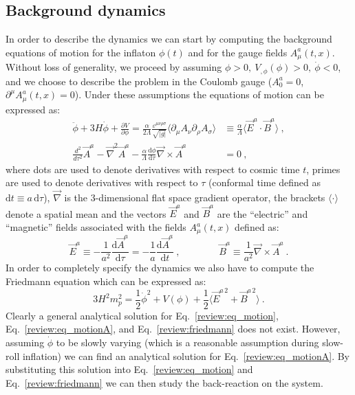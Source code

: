 \subsection{Background dynamics}
\label{review:background}
In order to describe the dynamics we can start by computing the background equations of motion for the inflaton $\phi(t)$ and for the gauge fields $A_\mu^a(t,x)$. Without loss of generality, we proceed by assuming $ \phi > 0, \ V_{,\phi}(\phi)>0, \ \dot{\phi} < 0$, and we choose to describe the problem in the Coulomb gauge ($A_0^a = 0$, $\partial^\mu A_\mu^a(t,x) = 0$). Under these assumptions the equations of motion can be expressed as:
\begin{align}
\label{review:eq_motion}
\ddot \phi + 3 H \dot{\phi} + \frac{\partial V}{\partial \phi} = \frac{\alpha}{2\Lambda} \frac{\varepsilon^{\mu\nu\rho\sigma}}{\sqrt{|g|}} \langle \partial_\mu A_\nu \partial_\rho A_\sigma \rangle & \equiv \frac{\alpha}{\Lambda} \langle \vec{E}^a \cdot \vec{B}^a \rangle \ ,\\
\frac{d^2}{d \tau^2}\vec{A}^a - \vec{\nabla}^2 \vec{A}^a - \frac{\alpha}{\Lambda} \frac{\textrm{d} \phi}{\textrm{d} \tau} \vec{\nabla} \times \vec{A}^a & = 0 \ , \label{review:eq_motionA}
\end{align}
where dots are used to denote derivatives with respect to cosmic time $t$, primes are used to denote derivatives with respect to $\tau$ (conformal time defined as $\textrm{d}t \equiv a \, \textrm{d}\tau$), $\vec{\nabla}$ is the $3$-dimensional flat space gradient operator, the brackets $\langle \cdot \rangle$ denote a spatial mean and the vectors $\vec{E}^a$ and $\vec{B}^a$ are the ``electric'' and ``magnetic'' fields associated with the fields $A_\mu^a(t,x)$ defined as:
\begin{equation}
	\label{review:electric_magnetic}
	\vec{E}^a \equiv -\frac{1 }{a^2} \frac{\textrm{d} \vec{A}^a}{\textrm{d} \tau} = -\frac{1 }{a} \frac{\textrm{d} \vec{A}^a}{\textrm{d} t} \ , \qquad \qquad  \vec{B}^a \equiv \frac{1}{a^2} \vec{\nabla} \times \vec{A}^a  \ .
\end{equation}
In order to completely specify the dynamics we also have to compute the Friedmann equation which can be expressed as:
\begin{equation}
\label{review:friedmann}
3 H^2 m_p^2 = \frac{1}{2} \dot{\phi}^2 + V(\phi) + \frac{1}{2} \langle \vec{E}^{a \, 2}  +  \vec{B}^{a \, 2}\rangle  \ .
\end{equation}
Clearly a general analytical solution for Eq.~\eqref{review:eq_motion}, Eq.~\eqref{review:eq_motionA}, and Eq.~\eqref{review:friedmann} does not exist. However, assuming $\dot{ \phi} $ to be slowly varying (which is a reasonable assumption during slow-roll inflation) we can find an analytical solution for Eq.~\eqref{review:eq_motionA}. By substituting this solution into Eq.~\eqref{review:eq_motion} and Eq.~\eqref{review:friedmann} we can then study the back-reaction on the system.

